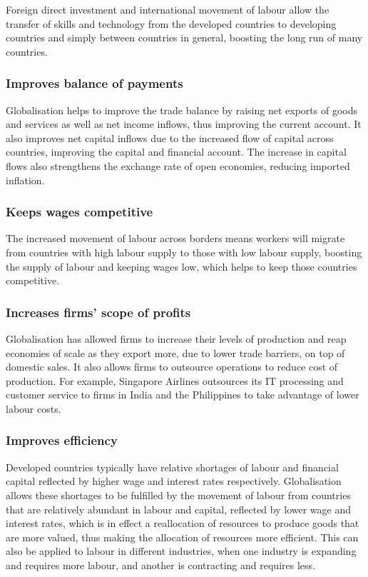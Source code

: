 \documentclass[Economics.tex]{subfiles}
\begin{document}
Foreign direct investment and international movement of labour allow the transfer of skills and technology from the developed countries to developing countries and simply between countries in general, boosting the long run \AS{} of many countries.
\subsubsection{Improves balance of payments}
Globalisation helps to improve the trade balance by raising net exports of goods and services as well as net income inflows, thus improving the current account. It also improves net capital inflows due to the increased flow of capital across countries, improving the capital and financial account. The increase in capital flows also strengthens the exchange rate of open economies, reducing imported inflation.
\subsubsection{Keeps wages competitive}
The increased movement of labour across borders means workers will migrate from countries with high labour supply to those with low labour supply, boosting the supply of labour and keeping wages low, which helps to keep those countries competitive.
\subsubsection{Increases firms' scope of profits}
Globalisation has allowed firms to increase their levels of production and reap economies of scale as they export more, due to lower trade barriers, on top of domestic sales. It also allows firms to outsource operations to reduce cost of production. For example, Singapore Airlines outsources its IT processing and customer service to firms in India and the Philippines to take advantage of lower labour costs.
\subsubsection{Improves efficiency}
Developed countries typically have relative shortages of labour and financial capital reflected by higher wage and interest rates respectively. Globalisation allows these shortages to be fulfilled by the movement of labour from countries that are relatively abundant in labour and capital, reflected by lower wage and interest rates, which is in effect a reallocation of resources to produce goods that are more valued, thus making the allocation of resources more efficient. This can also be applied to labour in different industries, when one industry is expanding and requires more labour, and another is contracting and requires less.
\end{document}
